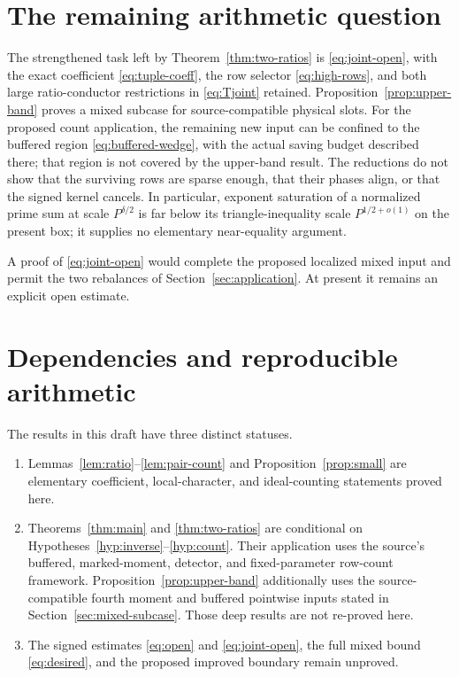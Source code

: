 \documentclass[11pt]{article}
\theoremstyle{definition}
\theoremstyle{remark}
\numberwithin{equation}{section}
\begin{document}
\section{The remaining arithmetic question}

The strengthened task left by Theorem~\ref{thm:two-ratios} is
\eqref{eq:joint-open}, with the exact coefficient
\eqref{eq:tuple-coeff}, the row selector \eqref{eq:high-rows}, and
both large ratio-conductor restrictions in \eqref{eq:Tjoint}
retained. Proposition~\ref{prop:upper-band} proves a mixed subcase
for source-compatible physical slots. For the proposed count
application, the remaining new input can be confined to the buffered
region \eqref{eq:buffered-wedge}, with the actual saving budget
described there; that region is not covered by the upper-band result.
The reductions do not show that the surviving rows are sparse enough,
that their phases align, or that the signed kernel cancels.
In particular, exponent saturation of a normalized prime sum at
scale $P^{\delta/2}$ is far below its triangle-inequality scale
$P^{1/2+o(1)}$ on the present box; it supplies no elementary
near-equality argument.

A proof of \eqref{eq:joint-open} would complete the proposed localized
mixed input and permit the two rebalances of
Section~\ref{sec:application}. At present it remains an explicit
open estimate.

\appendix
\section{Dependencies and reproducible arithmetic}\label{app:checks}

The results in this draft have three distinct statuses.
\begin{enumerate}
\item Lemmas~\ref{lem:ratio}--\ref{lem:pair-count} and
Proposition~\ref{prop:small} are elementary coefficient, local-character,
and ideal-counting statements proved here.
\item Theorems~\ref{thm:main} and \ref{thm:two-ratios} are conditional on
Hypotheses~\ref{hyp:inverse}--\ref{hyp:count}. Their application uses
the source's buffered, marked-moment, detector, and fixed-parameter
row-count framework. Proposition~\ref{prop:upper-band} additionally
uses the source-compatible fourth moment and buffered pointwise inputs
stated in Section~\ref{sec:mixed-subcase}. Those deep results are not
re-proved here.
\item The signed estimates \eqref{eq:open} and \eqref{eq:joint-open},
the full mixed bound
\eqref{eq:desired}, and the proposed improved boundary remain unproved.
\end{enumerate}
\end{document}
